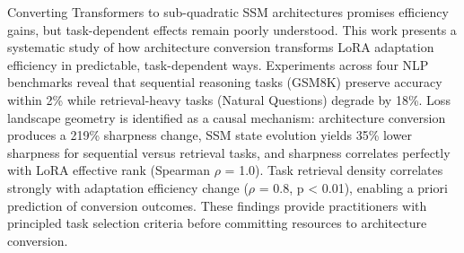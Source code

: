 
Converting Transformers to sub-quadratic SSM architectures promises efficiency gains, but task-dependent effects remain poorly understood. This work presents a systematic study of how architecture conversion transforms LoRA adaptation efficiency in predictable, task-dependent ways. Experiments across four NLP benchmarks reveal that sequential reasoning tasks (GSM8K) preserve accuracy within 2\% while retrieval-heavy tasks (Natural Questions) degrade by 18\%. Loss landscape geometry is identified as a causal mechanism: architecture conversion produces a 219\% sharpness change, SSM state evolution yields 35\% lower sharpness for sequential versus retrieval tasks, and sharpness correlates perfectly with LoRA effective rank (Spearman $\rho$ = 1.0). Task retrieval density correlates strongly with adaptation efficiency change ($\rho$ = 0.8, p < 0.01), enabling a priori prediction of conversion outcomes. These findings provide practitioners with principled task selection criteria before committing resources to architecture conversion.
